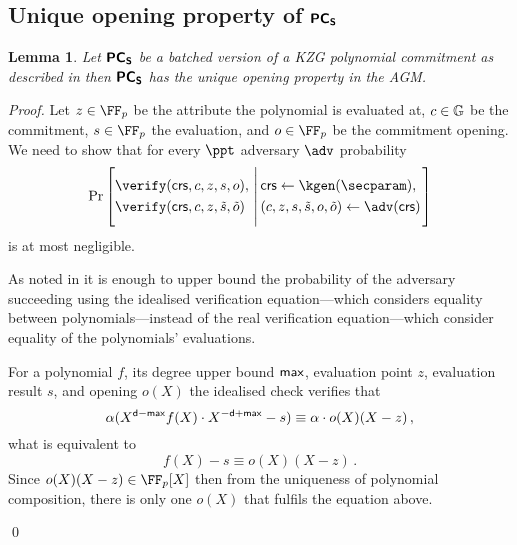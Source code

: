 \let\accentvec\vec \documentclass[runningheads]{llncs}
\newtheorem{lemma}[theorem]{Lemma}
\begin{document}
\subsection{Unique opening property of $\bm{\mathsf{PC}}_{\bm{\mathsf{S}}}$}
\begin{lemma}
\label{lem:pcoms_unique_op}
Let $\bm{\mathsf{PC}}_{\bm{\mathsf{S}}}$ be a batched version of a KZG polynomial commitment
\cite{AC:KatZavGol10} as described in \cite{CCS:MBKM19} then $\bm{\mathsf{PC}}_{\bm{\mathsf{S}}}$ has the
unique opening property in the AGM.  \end{lemma}
\begin{proof}
Let 
$z \in \FF_p$ be the attribute the polynomial is evaluated at,
$c \in \mathbb{G}$ be the commitment,  
$s \in \FF_p$ the evaluation, and 
$o \in \FF_p$ be the commitment opening. 
We need to show that for every $\ppt$ adversary $\adv$ probability
\[
	\Pr
		\left[
			\begin{aligned}
				& \verify(\crs, c, z, s, o), \\
				& \verify(\crs, c, z, \tilde{s}, \tilde{o})
			\end{aligned}
		\,\left|\,
		\vphantom{\begin{aligned}
			& \verify(\crs, c, z, s, o),\\
			& \verify(\crs, c, z, \tilde{s}, \tilde{o}) \\
			&o \neq \tilde{o})
		\end{aligned}}
		\begin{aligned}
			& \crs \gets \kgen(\secparam), \\
			&	(c, z, s, \tilde{s}, o, \tilde{o}) \gets \adv(\crs)
		\end{aligned}
		\right.\right]
\]
is at most negligible.

As noted in \cite[Lemma 2.2]{EPRINT:GabWilCio19} it is enough to upper bound the
probability of the adversary succeeding using the idealised verification
equation---which considers equality between polynomials---instead of the real
verification equation---which consider equality of the polynomials' evaluations.

For a polynomial $f$, its degree upper bound $\mathsf{max}$, evaluation point $z$,
evaluation result $s$, and opening $o(X)$ the idealised check verifies that
\begin{equation}
	\alpha (X^{\mathsf{d} - \mathsf{max}}f(X) \cdot X^{-\mathsf{d} + \mathsf{max}} -  s) \equiv \alpha \cdot o(X) (X - z)\,,
\end{equation}
what is equivalent to 
\begin{equation}
	f(X) -  s \equiv o(X) (X - z)\,.
	\label{eq:pcoms_idealised_check}
\end{equation}
Since $o(X)(X - z) \in \FF_p[X]$ then from the uniqueness of polynomial
composition, there is only one $o(X)$ that fulfils the equation above.

\qed
\end{proof}
\end{document}
